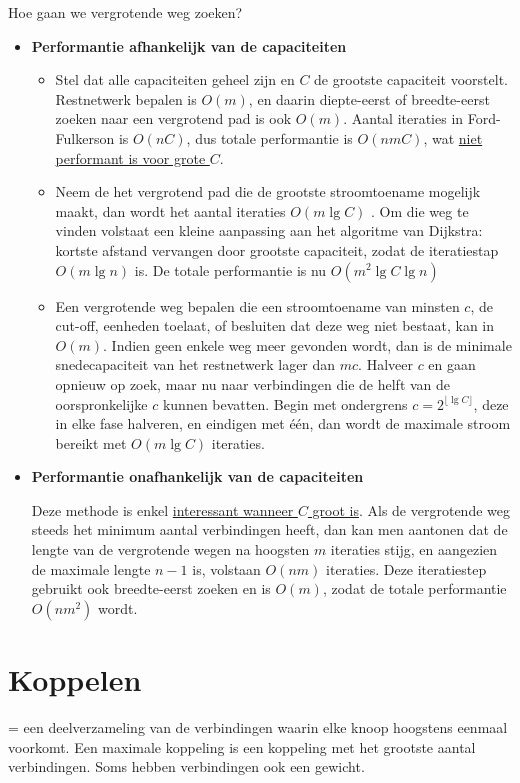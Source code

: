 \documentclass{report}
\begin{document}
Hoe gaan we vergrotende weg zoeken? 
\begin{itemize}
	\item \textbf{Performantie afhankelijk van de capaciteiten}
		\begin{itemize}
			\item Stel dat alle capaciteiten geheel zijn en $C$ de grootste capaciteit voorstelt. Restnetwerk bepalen is $O(m)$, en daarin diepte-eerst of breedte-eerst zoeken naar een vergrotend pad is ook $O(m)$. Aantal iteraties in Ford-Fulkerson is $O(nC)$, dus totale performantie is $O(nmC)$, wat \underline{niet performant is voor grote $C$}.
			\item Neem de het vergrotend pad die de grootste stroomtoename mogelijk maakt, dan wordt het aantal iteraties $O(m\lg C)$ . Om die weg te vinden volstaat een kleine aanpassing aan het algoritme van Dijkstra: kortste afstand vervangen door grootste capaciteit, zodat de iteratiestap $O(m \lg n)$  is. De totale performantie is nu $O(m^2 \lg C \lg n)$
			\item Een vergrotende weg bepalen die een stroomtoename van minsten $c$, de cut-off, eenheden toelaat, of besluiten dat deze weg niet bestaat, kan in $O(m)$. Indien geen enkele weg meer gevonden wordt, dan is de minimale snedecapaciteit van het restnetwerk lager dan $mc$. Halveer $c$ en gaan opnieuw op zoek, maar nu naar verbindingen die de helft van de oorspronkelijke $c$ kunnen bevatten. Begin met ondergrens $c = 2^{\lfloor \lg C \rfloor}$, deze in elke fase halveren, en eindigen met één, dan wordt de maximale stroom bereikt met $O(m \lg C)$ iteraties.
		\end{itemize}
	\item \textbf{Performantie onafhankelijk van de capaciteiten}

		Deze methode is enkel \underline{interessant wanneer $C$ groot is}. Als de vergrotende weg steeds het minimum aantal verbindingen heeft, dan kan men aantonen  dat de lengte van de vergrotende wegen na hoogsten $m$ iteraties stijg, en aangezien de maximale lengte $n - 1$ is, volstaan $O(nm)$ iteraties. Deze iteratiestep gebruikt ook breedte-eerst zoeken en is $O(m)$, zodat de totale performantie $O(nm^2)$ wordt.
\end{itemize}

\chapter{Koppelen}
= een deelverzameling van de verbindingen waarin elke knoop hoogstens eenmaal voorkomt. Een maximale koppeling is een koppeling met het grootste aantal verbindingen. Soms hebben verbindingen ook een gewicht.
\end{document}
